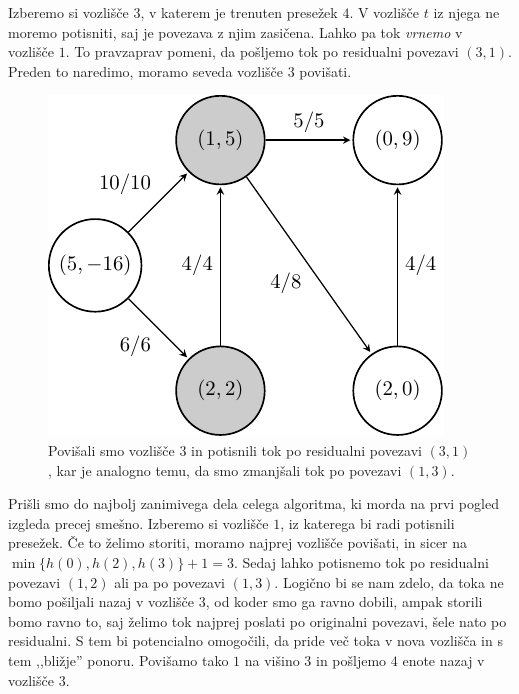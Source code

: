 \documentclass[mat1]{fmfdelo}
\begin{document}
Izberemo si vozlišče $3$, v katerem je trenuten presežek $4$. V vozlišče $t$ iz njega ne moremo potisniti, saj je povezava z njim zasičena. Lahko pa tok \textit{vrnemo}
v vozlišče $1$. To pravzaprav pomeni, da pošljemo tok po residualni povezavi $(3,1)$. Preden to naredimo, moramo seveda vozlišče $3$ povišati.

\begin{figure}[H]
  \centering
  \includegraphics{images/graf2-7.pdf}
  \caption{Povišali smo vozlišče $3$ in potisnili tok po residualni povezavi $(3,1)$, kar je analogno temu, da smo zmanjšali tok po povezavi $(1,3)$.}
\end{figure}

Prišli smo do najbolj zanimivega dela celega algoritma, ki morda na prvi pogled izgleda precej smešno. Izberemo si vozlišče $1$, iz katerega bi radi
potisnili presežek. Če to želimo storiti, moramo najprej vozlišče povišati, in sicer na $\min\{h(0), h(2), h(3)\} + 1 = 3$. Sedaj lahko potisnemo tok po residualni
povezavi $(1,2)$ ali pa po povezavi $(1,3)$. Logično bi se nam zdelo, da toka ne bomo pošiljali nazaj v vozlišče $3$, od koder smo ga ravno dobili, ampak storili
bomo ravno to, saj želimo tok najprej poslati po originalni povezavi, šele nato po residualni. S tem bi potencialno omogočili, da pride več toka v nova vozlišča in s tem
,,bližje'' ponoru. Povišamo tako $1$ na višino $3$ in pošljemo $4$ enote nazaj v vozlišče $3$.
\end{document}
